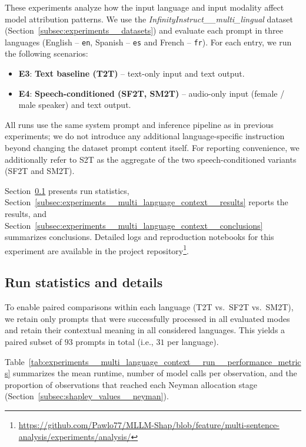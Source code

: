 These experiments analyze how the input language and input modality affect model attribution patterns. We use the \textit{InfinityInstruct\_\_multi\_lingual} dataset (Section~\ref{subsec:experiments__datasets}) and evaluate each prompt in three languages (English -- \texttt{en}, Spanish -- \texttt{es} and French -- \texttt{fr}). For each entry, we run the following scenarios:

\begin{itemize}
    \item \textbf{E3}: \textbf{Text baseline (T2T)} -- text-only input and text output.
    \item \textbf{E4}: \textbf{Speech-conditioned (SF2T, SM2T)} -- audio-only input (female / male speaker) and text output.
\end{itemize}

All runs use the same system prompt and inference pipeline as in previous experiments; we do not introduce any additional language-specific instruction beyond changing the dataset prompt content itself. For reporting convenience, we additionally refer to S2T as the aggregate of the two speech-conditioned variants (SF2T and SM2T).

Section~\ref{subsec:experiments__multi_language_context__run} presents run statistics, Section~\ref{subsec:experiments__multi_language_context__results} reports the results, and Section~\ref{subsec:experiments__multi_language_context__conclusions} summarizes conclusions. Detailed logs and reproduction notebooks for this experiment are available in the project repository\footnote{\url{https://github.com/Pawlo77/MLLM-Shap/blob/feature/multi-sentence-analysis/experiments/analysis/}}.

\subsection{Run statistics and details}
\label{subsec:experiments__multi_language_context__run}

To enable paired comparisons within each language (T2T vs.\ SF2T vs.\ SM2T), we retain only prompts that were successfully processed in all evaluated modes and retain their contextual meaning in all considered languages. This yields a paired subset of $93$ prompts in total (i.e., $31$ per language).

Table~\ref{tab:experiments__multi_language_context__run__performance_metrics} summarizes the mean runtime, number of model calls per observation, and the proportion of observations that reached each Neyman allocation stage (Section~\ref{subsec:shapley_values__neyman}).

